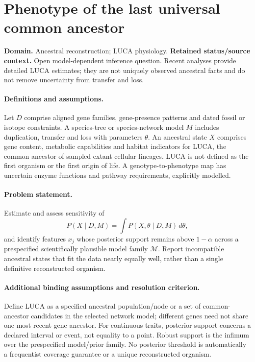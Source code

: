 \documentclass[11pt]{article}
\begin{document}
\section*{Phenotype of the last universal common ancestor}
\label{prob:294}
\label{rank:193}
\par\smallskip

\noindent\textbf{Domain.} Ancestral reconstruction; LUCA physiology. \quad \textbf{Retained status/source context.} Open model-dependent inference question. Recent analyses provide detailed LUCA estimates; they are not uniquely observed ancestral facts and do not remove uncertainty from transfer and loss.

\paragraph{Definitions and assumptions.} Let $D$ comprise aligned gene families, gene-presence patterns and dated fossil or isotope constraints. A species-tree or species-network model $M$ includes duplication, transfer and loss with parameters $\theta$. An ancestral state $X$ comprises gene content, metabolic capabilities and habitat indicators for LUCA, the common ancestor of sampled extant cellular lineages. LUCA is not defined as the first organism or the first origin of life. A genotype-to-phenotype map has uncertain enzyme functions and pathway requirements, explicitly modelled.

\paragraph{Problem statement.} Estimate and assess sensitivity of
\[
P(X\mid D,M)=\int P(X,\theta\mid D,M)\,d\theta,
\]
and identify features $x_j$ whose posterior support remains above $1-\alpha$ across a prespecified scientifically plausible model family $\mathcal M$. Report incompatible ancestral states that fit the data nearly equally well, rather than a single definitive reconstructed organism.

\paragraph{Additional binding assumptions and resolution criterion.} Define LUCA as a specified ancestral population/node or a set of common-ancestor candidates in the selected network model; different genes need not share one most recent gene ancestor. For continuous traits, posterior support concerns a declared interval or event, not equality to a point. Robust support is the infimum over the prespecified model/prior family. No posterior threshold is automatically a frequentist coverage guarantee or a unique reconstructed organism.
\end{document}
